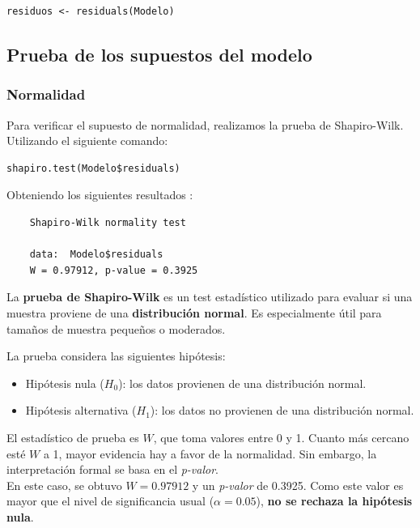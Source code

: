 \documentclass{rapport}
\begin{document}
\begin{lstlisting}[style=rstyle]
residuos <- residuals(Modelo)
\end{lstlisting}

\subsection{Prueba de los supuestos del modelo}

\subsubsection{Normalidad} 
Para verificar el supuesto de normalidad, realizamos la prueba de Shapiro-Wilk. Utilizando el siguiente comando:

\begin{lstlisting}[style=rstyle]
shapiro.test(Modelo$residuals)
\end{lstlisting}

Obteniendo los siguientes resultados : 

\begin{verbatim}
    Shapiro-Wilk normality test

    data:  Modelo$residuals
    W = 0.97912, p-value = 0.3925
\end{verbatim}

La \textbf{prueba de Shapiro-Wilk} es un test estadístico utilizado para evaluar si una muestra proviene de una \textbf{distribución normal}. Es especialmente útil para tamaños de muestra pequeños o moderados.

La prueba considera las siguientes hipótesis:
\begin{itemize}
    \item Hipótesis nula (\(H_0\)): los datos provienen de una distribución normal.
    \item Hipótesis alternativa (\(H_1\)): los datos no provienen de una distribución normal.
\end{itemize}

El estadístico de prueba es \(W\), que toma valores entre 0 y 1. Cuanto más cercano esté \(W\) a 1, mayor evidencia hay a favor de la normalidad. Sin embargo, la interpretación formal se basa en el \textit{p-valor}.\cite{montgomery2019diseno}\\

En este caso, se obtuvo \(W = 0.97912\) y un \textit{p-valor} de 0.3925. Como este valor es mayor que el nivel de significancia usual (\(\alpha = 0.05\)), \textbf{no se rechaza la hipótesis nula}. \\
\end{document}

